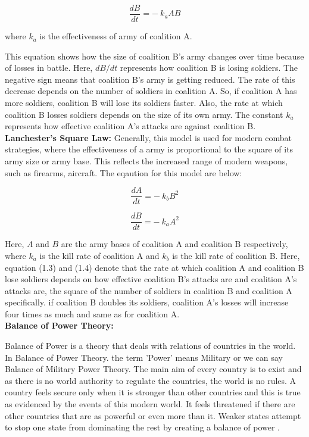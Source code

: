 \documentclass[oneside,12pt]{report}
\begin{document}
\begin{equation}
\frac{dB}{dt} = -\ k_a A B
\end{equation}

where \(k_a\) is the effectiveness of army of coalition A.

This equation shows how the size of coalition B's army changes over time because of losses in battle. Here, \(dB/dt\) represents how coalition B is losing soldiers. The negative sign means that coalition B's army is getting reduced. The rate of this decrease depends on the number of soldiers in coalition A. So, if coalition A has more soldiers, coalition B will lose its soldiers faster. Also, the rate at which coalition B losses soldiers depends on the size of its own army. The constant \(k_a\) represents how effective coalition A's attacks are against coalition B.
\\[2em]
\textbf{Lanchester's Square Law:}
Generally, this model is used for modern combat strategies, where the effectiveness of a army is proportional to the square of its army size or army base. This reflects the increased range of modern weapons, such as firearms, aircraft. The eqaution for this model are below: \cite{r1}

\begin{equation}
\frac{dA}{dt} = -\ k_b B^2
\end{equation}

\begin{equation}
\frac{dB}{dt} = -\ k_a A^2
\end{equation}

Here, \( A \) and \( B \) are the army bases of coalition A and coalition B respectively, where \( k_a \) is the kill rate of coalition A and \( k_b \) is the kill rate of coalition B. Here, equation (1.3) and (1.4) denote that the rate at which coalition A and coalition B lose soldiers depends on how effective coalition B's attacks are and coalition A's attacks are, the square of the number of soldiers in coalition B and coalition A specifically. if coalition B doubles its soldiers, coalition A's losses will increase four times as much and same as for coalition A.
\\[2em]
\textbf{Balance of Power Theory:}

Balance of Power is a theory that deals with relations of countries in the world. In Balance of Power Theory. the term 'Power' means Military or we can say Balance of Military Power Theory. The main aim of every country is to exist and as there is no world authority to regulate the countries, the world is no rules. A country feels secure only when it is stronger than other countries and this is true as evidenced by the events of this modern world. It feels threatened if there are other countries that are as powerful or even more than it. Weaker states attempt to stop one state from dominating the rest by creating a balance of power \cite{r3}.
\end{document}
